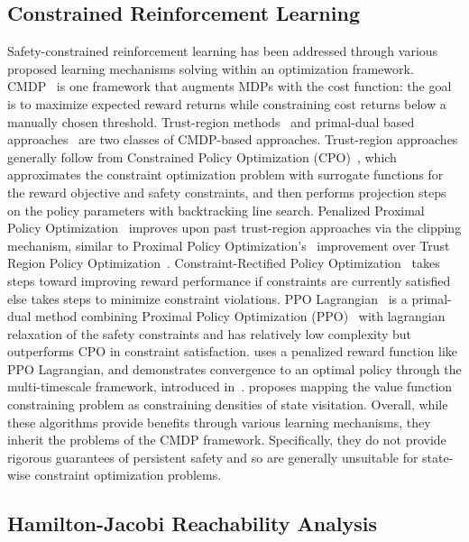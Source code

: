 \documentclass{article}
\theoremstyle{definition}
\begin{document}
\subsection{Constrained Reinforcement Learning}
\vspace{-5pt}
Safety-constrained reinforcement learning has been addressed through various proposed learning mechanisms solving within an optimization framework. CMDP~\cite{CMDP, brunke2022safe} is one framework that augments MDPs with the cost function: the goal is to maximize expected reward returns while constraining cost returns below a manually chosen threshold. Trust-region methods~\cite{YangProj, zhang2020first, yang2022cup, achiam2017constrained} and primal-dual based approaches~\cite{tessler, ma2021feasible, ray2019benchmarking, duan2022adaptive} are two classes of CMDP-based approaches. Trust-region approaches generally follow from Constrained Policy Optimization (CPO)~\cite{achiam2017constrained}, which approximates the constraint optimization problem with surrogate functions for the reward objective and safety constraints, and then performs projection steps on the policy parameters with backtracking line search. Penalized Proximal Policy Optimization~\cite{Zhang2022PenalizedPP} improves upon past trust-region approaches via the clipping mechanism, similar to Proximal Policy Optimization's~\cite{PPO} improvement over Trust Region Policy Optimization~\cite{TRPO}. Constraint-Rectified Policy Optimization~\cite{xu2021crpo} takes steps toward improving reward performance if constraints are currently satisfied else takes steps to minimize constraint violations. PPO Lagrangian~\cite{ray2019benchmarking} is a primal-dual method combining Proximal Policy Optimization (PPO)~\cite{PPO} with lagrangian relaxation of the safety constraints and has relatively low complexity but outperforms CPO in constraint satisfaction. \cite{tessler} uses a penalized reward function like PPO Lagrangian, and demonstrates convergence to an optimal policy through the multi-timescale framework, introduced in~\cite{borkar2009stochastic}. \cite{qin2021density} proposes mapping the value function constraining problem as constraining densities of state visitation. Overall, while these algorithms provide benefits through various learning mechanisms, they inherit the problems of the CMDP framework. Specifically, they do not provide rigorous guarantees of persistent safety and so are generally unsuitable for state-wise constraint optimization problems.



\subsection{Hamilton-Jacobi Reachability Analysis}
 
\end{document}
